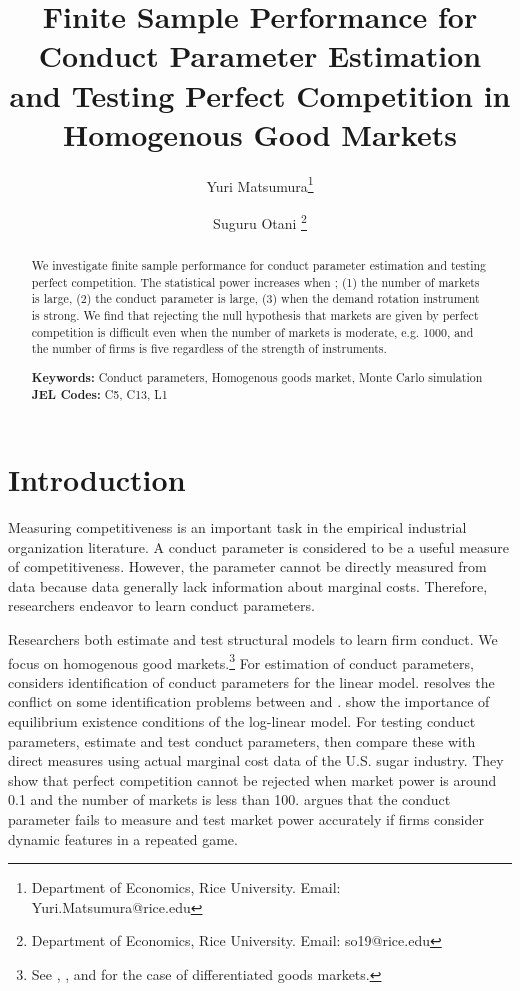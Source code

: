 \documentclass[11pt, a4paper]{article}
\title{Finite Sample Performance for Conduct Parameter Estimation and Testing Perfect Competition in Homogenous Good Markets}
\author{Yuri Matsumura\thanks{Department of Economics, Rice University. Email: Yuri.Matsumura@rice.edu} \and Suguru Otani \thanks{Department of Economics, Rice University. Email: so19@rice.edu
}}
\begin{document}
\maketitle
\begin{abstract}
    We investigate finite sample performance for conduct parameter estimation and testing perfect competition. The statistical power increases when ; (1) the number of markets is large, (2) the conduct parameter is large, (3) when the demand rotation instrument is strong. We find that rejecting the null hypothesis that markets are given by perfect competition is difficult even when the number of markets is moderate, e.g. 1000, and the number of firms is five regardless of the strength of instruments.
\vspace{0.1in}

\noindent\textbf{Keywords:} Conduct parameters, Homogenous goods market, Monte Carlo simulation
\vspace{0in}
\newline
\noindent\textbf{JEL Codes:} C5, C13, L1

\bigskip
\end{abstract}


\section{Introduction}
Measuring competitiveness is an important task in the empirical industrial organization literature.
A conduct parameter is considered to be a useful measure of competitiveness. 
However, the parameter cannot be directly measured from data because data generally lack information about marginal costs.
Therefore, researchers endeavor to learn conduct parameters.

Researchers both estimate and test structural models to learn firm conduct.
We focus on homogenous good markets.\footnote{See \cite{nevoIdentificationOligopolySolution1998}, \cite{magnolfi2022comparison}, and \cite{duarte2023testing} for the case of differentiated goods markets.}
For estimation of conduct parameters, \citet{bresnahan1982oligopoly} considers identification of conduct parameters for the linear model. \cite{matsumura2023resolving} resolves the conflict on some identification problems between \cite{bresnahan1982oligopoly} and \cite{perloff2012collinearity}. \cite{matsumura2023mpec} show the importance of equilibrium existence conditions of the log-linear model. 
For testing conduct parameters, \cite{genesove1998testing} estimate and test conduct parameters, then compare these with direct measures using actual marginal cost data of the U.S. sugar industry. 
They show that perfect competition cannot be rejected when market power is around 0.1 and the number of markets is less than 100.
\cite{corts1999conduct} argues that the conduct parameter fails to measure and test market power accurately if firms consider dynamic features in a repeated game.
\end{document}
